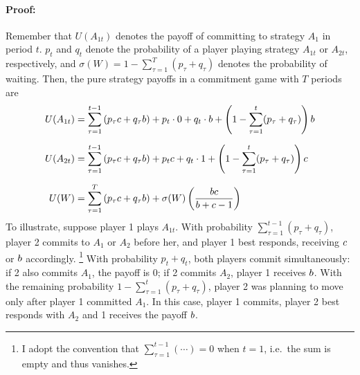 \documentclass[main.tex]{subfiles}
\begin{document}
\paragraph{Proof:}
Remember that $U(A_{1t})$ denotes the payoff of committing to strategy $A_1$ in period $t$. $p_t$ and $q_t$ denote the probability of a player playing strategy $A_{1t}$ or $A_{2t}$, respectively, and $\sigma(W)=1-\sum_{\tau=1}^T(p_\tau+q_\tau)$ denotes the probability of waiting. Then, the pure strategy payoffs in a commitment game with $T$ periods are
\begin{align}
U(A_{1t}) &= \sum_{\tau=1}^{t-1}\left( p_\tau c + q_\tau b \right) + p_t \cdot 0 + q_t \cdot b + \left(1 - \sum_{\tau=1}^{t}(p_\tau + q_\tau)\right) b
\label{eq:U_A1t} \\[6pt]
U(A_{2t}) &= \sum_{\tau=1}^{t-1}\left( p_\tau c + q_\tau b \right) + p_t c + q_t \cdot 1 + \left(1 - \sum_{\tau=1}^{t}(p_\tau + q_\tau) \right) c
\label{eq:U_A2t} \\[6pt]
U(W) &= \sum_{\tau=1}^{T} \left( p_\tau c + q_\tau b \right) + \sigma(W) \left( \frac{bc}{b + c - 1} \right)
\label{eq:U_W}
\end{align}
To illustrate, suppose player 1 plays $A_{1t}$. With probability $\sum_{\tau=1}^{t-1}(p_\tau + q_\tau)$, player 2 commits to $A_1$ or $A_2$ before her, and player 1 best responds, receiving $c$ or $b$ accordingly. 
\footnote{I adopt the convention that $\sum_{\tau=1}^{t-1} (\cdots) = 0$ when $t=1$, i.e.\ the sum is empty and thus vanishes.}
With probability $p_t + q_t$, both players commit simultaneously: if 2 also commits $A_1$, the payoff is $0$; if 2 commits $A_2$, player 1 receives $b$. With the remaining probability $1 - \sum_{\tau=1}^{t}(p_\tau + q_\tau)$, player 2 was planning to move only after player 1 committed $A_1$. In this case, player 1 commits, player 2 best responds with $A_2$ and 1 receives the payoff $b$.
 
\end{document}
